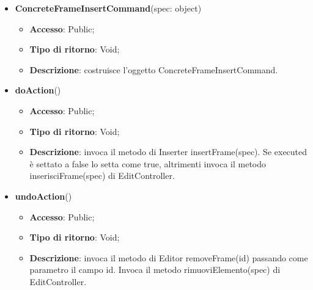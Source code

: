 {{{	
	\begin{itemize}
		\item \textbf{ConcreteFrameInsertCommand}(spec: object)
		\begin{itemize}
			\item \textbf{Accesso}: Public;
			\item \textbf{Tipo di ritorno}: Void;
			\item \textbf{Descrizione}: costruisce l’oggetto ConcreteFrameInsertCommand.
		\end{itemize}
		\item \textbf{doAction}()
		\begin{itemize}
			\item \textbf{Accesso}: Public;
			\item \textbf{Tipo di ritorno}: Void;
			\item \textbf{Descrizione}: invoca il metodo di Inserter insertFrame(spec). Se executed è settato a false lo setta come true, altrimenti invoca il metodo inserisciFrame(spec) di EditController.
		\end{itemize}
		\item \textbf{undoAction}()
		\begin{itemize}
			\item \textbf{Accesso}: Public;
			\item \textbf{Tipo di ritorno}: Void;
			\item \textbf{Descrizione}: invoca il metodo di Editor removeFrame(id) passando come parametro il campo id. Invoca il metodo rimuoviElemento(spec) di EditController.
		\end{itemize}
	\end{itemize}
	}

}}
